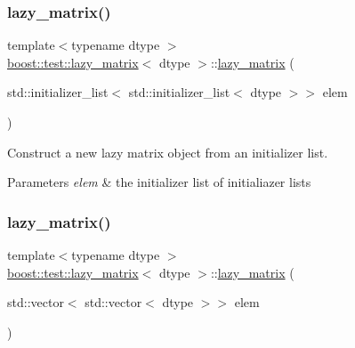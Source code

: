 \subsubsection{\texorpdfstring{lazy\_matrix()}{lazy\_matrix()}\hspace{0.1cm}{\footnotesize\ttfamily [2/4]}}
{\footnotesize\ttfamily template$<$typename dtype $>$ \\
\mbox{\hyperlink{classboost_1_1test_1_1lazy__matrix}{boost\+::test\+::lazy\+\_\+matrix}}$<$ dtype $>$\+::\mbox{\hyperlink{classboost_1_1test_1_1lazy__matrix}{lazy\+\_\+matrix}} (\begin{DoxyParamCaption}\item[{std\+::initializer\+\_\+list$<$ std\+::initializer\+\_\+list$<$ dtype $>$$>$}]{elem }\end{DoxyParamCaption})\hspace{0.3cm}{\ttfamily [inline]}}



Construct a new lazy matrix object from an initializer list. 


\begin{DoxyParams}{Parameters}
{\em elem} & the initializer list of initialiazer lists \\
\hline
\end{DoxyParams}
\mbox{\label{classboost_1_1test_1_1lazy__matrix_a46c807d6ff20651daf91e4d1e41d07aa}} 
\subsubsection{\texorpdfstring{lazy\_matrix()}{lazy\_matrix()}\hspace{0.1cm}{\footnotesize\ttfamily [3/4]}}
{\footnotesize\ttfamily template$<$typename dtype $>$ \\
\mbox{\hyperlink{classboost_1_1test_1_1lazy__matrix}{boost\+::test\+::lazy\+\_\+matrix}}$<$ dtype $>$\+::\mbox{\hyperlink{classboost_1_1test_1_1lazy__matrix}{lazy\+\_\+matrix}} (\begin{DoxyParamCaption}\item[{std\+::vector$<$ std\+::vector$<$ dtype $>$$>$}]{elem }\end{DoxyParamCaption})\hspace{0.3cm}{\ttfamily [inline]}}



